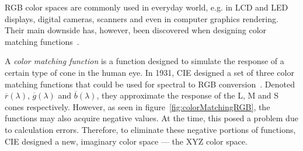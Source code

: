 RGB color spaces are commonly used in everyday world, e.g. in LCD and LED displays, digital cameras, scanners and even in computer graphics rendering. Their main downside has, however, been discovered when designing color matching functions~\cite{colorMatchingDerivation}.

A \emph{color matching function} is a function designed to simulate the response of a certain type of cone in the human eye. In 1931, CIE designed a set of three color matching functions that could be used for spectral to RGB conversion~\cite{colorMatchingDerivation}. Denoted $\overline{r}(\lambda)$, $\overline{g}(\lambda)$ and $\overline{b}(\lambda)$, they approximate the response of the L, M and S cones respectively. However, as seen in figure~\cref{fig:colorMatchingRGB}, the functions may also acquire negative values. At the time, this posed a problem due to calculation errors. Therefore, to eliminate these negative portions of functions, CIE designed a new, imaginary color space --- the XYZ color space.

